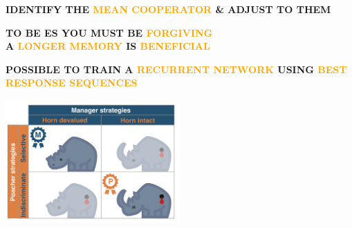 \documentclass{beamer}
\begin{document}
\begin{frame}
    \begin{center}
    \Large{\textbf{IDENTIFY THE \textcolor{orange}{MEAN COOPERATOR} \& ADJUST TO THEM}} \\ 
    \end{center}
\end{frame}

\begin{frame}
    \begin{center}
    \Large{\textbf{TO BE ES YOU MUST BE \textcolor{orange}{FORGIVING}}} \\ \vspace{1cm}
    \Large{\textbf{A \textcolor{orange}{LONGER MEMORY} IS \textcolor{orange}{BENEFICIAL}}} \\
    \end{center}
\end{frame}

\begin{frame}
    \begin{center}
    \Large{\textbf{POSSIBLE TO TRAIN A \textcolor{orange}{RECURRENT NETWORK} USING \textcolor{orange}{BEST RESPONSE SEQUENCES}}} \\
    \end{center}
\end{frame}

\begin{frame}
    \begin{center}
    \includegraphics[width=0.5\textwidth]{static/RhinoPic.pdf}\hspace{12pt}
     \\
    \end{center}
\end{frame}
\end{document}
